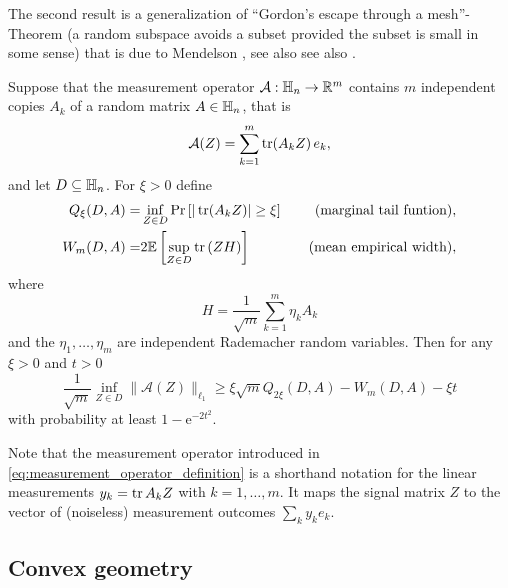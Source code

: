 The second result is a generalization of ``Gordon's escape through a mesh''-Theorem \cite{gordon_milman_1988} (a random subspace avoids a subset provided the subset is small in some sense) that is due to Mendelson \cite{mendelson_learning_2015,koltchinskii_bounding_2015}, see also see also \cite{tropp_convex_2015}.

\begin{theorem} \label{thm:mendelson}
  Suppose that the measurement operator $\mathcal{A}:\mathbb{H}_n \to \mathbb{R}^m$ contains $m$ independent copies $ A_k$ of a random matrix $ A \in \mathbb{H}_n$, that is
  \begin{equation}
    \label{eq:measurement_operator_definition}
    \mathcal{A}( Z) = \sum_{k=1}^m \operatorname{tr} ( A_k  Z) \,  e_k,
  \end{equation}
  and let $D \subseteq \mathbb{H}_n$.
  For $\xi >0$ define
  \begin{align}
    Q_\xi (D,  A) =& \inf_{ Z \in D}\mathrm{Pr} \left[ | \operatorname{tr} ( A_k  Z) | \geq \xi \right] \quad &\textrm{(marginal tail funtion)}, \label{eq:marginal_tail_function}\\
    W_m (D,  A) =& 2 \mathbb{E} \left[ \sup_{ Z \in D} \operatorname{tr} \left(  Z  H \right) \right] \quad &\textrm{(mean empirical width)},
  \end{align}
  where
  \begin{equation}
     H= \frac{1}{\sqrt{m}} \sum_{k=1}^m \eta_k  A_k
  \end{equation}
  and the $\eta_1,\ldots,\eta_m$ are independent Rademacher random variables.
  Then for any $\xi >0$ and $t >0$
  \begin{equation}
    \frac{1}{\sqrt{m}}\inf_{ Z \in D} \| \mathcal{A}( Z) \|_{\ell_1} \geq \xi \sqrt{m} Q_{2\xi}(D,  A) -  W_m (D,  A)-\xi t \label{eq:mendelson}
  \end{equation}
  with probability at least $1-\mathrm{e}^{-2t^2}$.
\end{theorem}

Note that the measurement operator introduced in \cref{eq:measurement_operator_definition} is a shorthand notation for the linear measurements $y_k = \operatorname{tr}  A_k  Z$ with $k=1,\ldots,m$.
It maps the signal matrix $ Z$ to the vector of (noiseless) measurement outcomes $\sum_k y_k  e_k$.


\subsection{Convex geometry}

